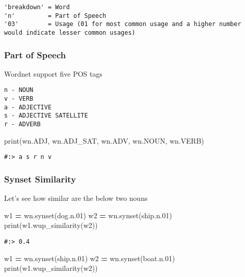 \documentclass[
]{book}
\newenvironment{Shaded}{\begin{snugshade}}{\end{snugshade}}
\newcommand{\BuiltInTok}[1]{#1}
\newcommand{\NormalTok}[1]{#1}
\newcommand{\OperatorTok}[1]{\textcolor[rgb]{0.43,0.43,0.43}{\textbf{#1}}}
\newcommand{\StringTok}[1]{\textcolor[rgb]{0.5,0.5,0.5}{#1}}
\begin{document}
\begin{verbatim}
'breakdown' = Word
'n'         = Part of Speech
'03'        = Usage (01 for most common usage and a higher number would indicate lesser common usages)
\end{verbatim}

\hypertarget{part-of-speech}{%
\subsubsection{Part of Speech}\label{part-of-speech}}

Wordnet support five POS tags

\begin{verbatim}
n - NOUN
v - VERB
a - ADJECTIVE
s - ADJECTIVE SATELLITE
r - ADVERB
\end{verbatim}

\begin{Shaded}
\begin{Highlighting}[]
\BuiltInTok{print}\NormalTok{(wn.ADJ, wn.ADJ\_SAT, wn.ADV, wn.NOUN, wn.VERB)}
\end{Highlighting}
\end{Shaded}

\begin{verbatim}
#:> a s r n v
\end{verbatim}

\hypertarget{synset-similarity}{%
\subsubsection{Synset Similarity}\label{synset-similarity}}

Let's see how similar are the below two nouns

\begin{Shaded}
\begin{Highlighting}[]
\NormalTok{w1 }\OperatorTok{=}\NormalTok{ wn.synset(}\StringTok{\textquotesingle{}dog.n.01\textquotesingle{}}\NormalTok{)}
\NormalTok{w2 }\OperatorTok{=}\NormalTok{ wn.synset(}\StringTok{\textquotesingle{}ship.n.01\textquotesingle{}}\NormalTok{)}
\BuiltInTok{print}\NormalTok{(w1.wup\_similarity(w2))}
\end{Highlighting}
\end{Shaded}

\begin{verbatim}
#:> 0.4
\end{verbatim}

\begin{Shaded}
\begin{Highlighting}[]
\NormalTok{w1 }\OperatorTok{=}\NormalTok{ wn.synset(}\StringTok{\textquotesingle{}ship.n.01\textquotesingle{}}\NormalTok{)}
\NormalTok{w2 }\OperatorTok{=}\NormalTok{ wn.synset(}\StringTok{\textquotesingle{}boat.n.01\textquotesingle{}}\NormalTok{)}
\BuiltInTok{print}\NormalTok{(w1.wup\_similarity(w2))}
\end{Highlighting}
\end{Shaded}
\end{document}
